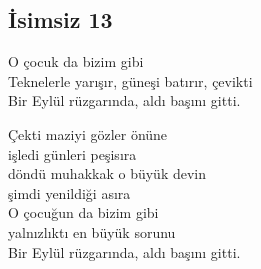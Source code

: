 \subsection{İsimsiz 13}

O çocuk da bizim gibi \\
Teknelerle yarışır, güneşi batırır, çevikti \\
Bir Eylül rüzgarında, aldı başını gitti.

\noindent\newline
Çekti maziyi gözler önüne \\
işledi günleri peşisıra \\
döndü muhakkak o büyük devin \\
şimdi yenildiği asıra \\
O çocuğun da bizim gibi \\
yalnızlıktı en büyük sorunu \\
Bir Eylül rüzgarında, aldı başını gitti.